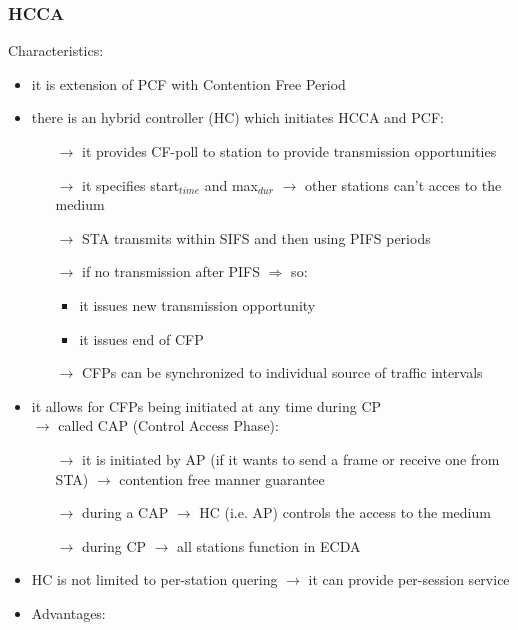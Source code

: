 \subsubsection{HCCA}
Characteristics:
\begin{itemize}
    \item it is extension of PCF with Contention Free Period
    \item there is an hybrid controller (HC) which initiates HCCA and PCF:
    \begin{itemize}
        \item[$\rightarrow$] it provides CF-poll to station to provide transmission opportunities
        \item[$\rightarrow$] it specifies start$_{time}$ and max$_{dur}$ $\rightarrow$ other stations can't acces to the medium
        \item[$\rightarrow$] STA transmits within SIFS and then using PIFS periods
        \item[$\rightarrow$] if no transmission after PIFS $\Rightarrow$ so:
        \begin{itemize}
            \item it issues new transmission opportunity
            \item it issues end of CFP
        \end{itemize} 
        \item[$\rightarrow$] CFPs can be synchronized to individual source of traffic intervals
    \end{itemize} 
    \item it allows for CFPs being initiated at any time during CP\\
    $\rightarrow$ called CAP (Control Access Phase):
    \begin{itemize}
        \item[$\rightarrow$] it is initiated by AP (if it wants to send a frame or receive one from STA) $\rightarrow$ contention free manner guarantee
        \item[$\rightarrow$] during a CAP $\rightarrow$ HC (i.e. AP) controls the access to the medium
        \item[$\rightarrow$] during CP $\rightarrow$ all stations function in ECDA
    \end{itemize}
    \item HC is not limited to per-station quering $\rightarrow$ it can provide per-session service
    \item Advantages:
    \begin{itemize}

\end{itemize}
\end{itemize}
